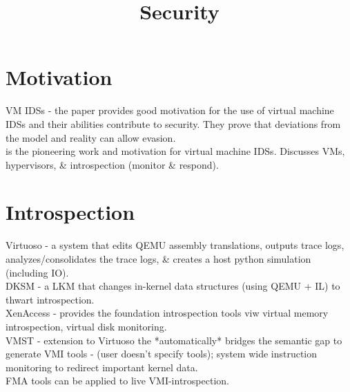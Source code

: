 \documentclass{article}
\begin{document}
\title{Security}
\maketitle

\section{Motivation}

\noindent\cite{garfinkel:NDSSS2003-VM-introspection} VM IDSs - the paper provides good motivation for the use of virtual machine IDSs and their abilities contribute to security. They prove that deviations from the model and reality can allow evasion.\\

\noindent\cite{laureano:euromicro2004-idsInVMs} is the pioneering work and motivation for virtual machine IDSs. Discusses VMs, hypervisors, \& introspection (monitor \& respond).

\section{Introspection}

\noindent\cite{dolan-gavitt:ieeesp2011-virtuoso} Virtuoso - a system that edits QEMU assembly translations, outputs trace logs, analyzes/consolidates the trace logs, \& creates a host python simulation (including IO).\\

\noindent\cite{bahram:IEEErds2012-DKSM} DKSM - a LKM that changes in-kernel data structures (using QEMU + IL) to thwart introspection. \\

\noindent\cite{payne:acsac2007-secure-flexible-vm-monitoring} XenAccess -  provides the foundation introspection tools viw virtual {memory introspection, virtual disk monitoring}.\\

\noindent\cite{fu:sp2012-space-traveling} VMST - extension to Virtuoso the *automatically* bridges the semantic gap to generate VMI tools - (user doesn't specify tools); system wide instruction monitoring to redirect important kernel data. \\

\noindent\cite{dolan-gavitt:techreport2011-leveraging-forensic-introspection} FMA tools can be applied to live VMI-introspection. \\
\end{document}
